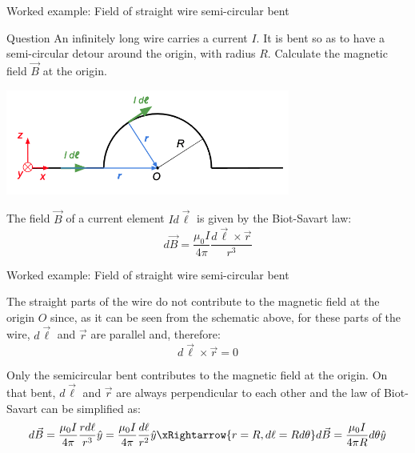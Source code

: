 {
\problemslide

%
%
%

\begin{frame}{Worked example: Field of straight wire semi-circular bent}

  \begin{blockexmplque}{Question}
    An infinitely long wire carries a current $I$.
    It is bent so as to have a semi-circular detour around the origin,
    with radius $R$. Calculate the magnetic field $\vec{B}$ at the origin.
  \end{blockexmplque}

  \begin{center}
    \includegraphics[width=0.70\textwidth]{./images/problems/lect05_wire_with_semicircular_bent_2}\\
  \end{center}

  The field $\vec{B}$ of a current element $Id\vec{\ell}$
  is given by the Biot-Savart law:
  \begin{equation*}
    d\vec{B} = \frac{\mu_0I}{4\pi} \frac{d\vec{\ell} \times \vec{r}}{r^3}
  \end{equation*}

\end{frame}

%
%
%

\begin{frame}{Worked example: Field of straight wire semi-circular bent}

The straight parts of the wire do not contribute to the magnetic field at the
origin $O$ since, as it can be seen from the schematic above, for these parts
of the wire, $d\vec{\ell}$ and $\vec{r}$ are parallel and, therefore:
\begin{equation*}
  d\vec{\ell} \times \vec{r} = 0
\end{equation*}

Only the semicircular bent contributes to the magnetic field at the origin.
On that bent, $d\vec{\ell}$ and $\vec{r}$ are always perpendicular
to each other and the law of Biot-Savart can be simplified as:
\begin{equation*}
  d\vec{B} = \frac{\mu_0I}{4\pi} \frac{r d\ell}{r^3} \hat{y}
           = \frac{\mu_0I}{4\pi} \frac{d\ell}{r^2} \hat{y} \xRightarrow{r=R, d\ell=Rd\theta}
  d\vec{B} = \frac{\mu_0I}{4\pi R} d\theta \hat{y}
\end{equation*}


\end{frame}}

